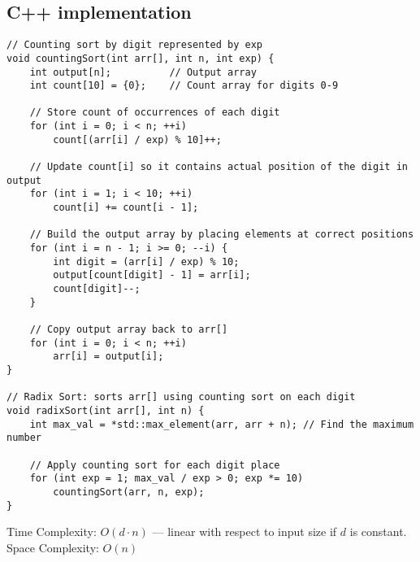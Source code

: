 \documentclass{article}
\begin{document}
\subsection{C++ implementation}

\begin{lstlisting}[style=cppstyle]
// Counting sort by digit represented by exp
void countingSort(int arr[], int n, int exp) {
    int output[n];          // Output array
    int count[10] = {0};    // Count array for digits 0-9

    // Store count of occurrences of each digit
    for (int i = 0; i < n; ++i)
        count[(arr[i] / exp) % 10]++;

    // Update count[i] so it contains actual position of the digit in output
    for (int i = 1; i < 10; ++i)
        count[i] += count[i - 1];

    // Build the output array by placing elements at correct positions
    for (int i = n - 1; i >= 0; --i) {
        int digit = (arr[i] / exp) % 10;
        output[count[digit] - 1] = arr[i];
        count[digit]--;
    }

    // Copy output array back to arr[]
    for (int i = 0; i < n; ++i)
        arr[i] = output[i];
}

// Radix Sort: sorts arr[] using counting sort on each digit
void radixSort(int arr[], int n) {
    int max_val = *std::max_element(arr, arr + n); // Find the maximum number

    // Apply counting sort for each digit place
    for (int exp = 1; max_val / exp > 0; exp *= 10)
        countingSort(arr, n, exp);
}
\end{lstlisting}



 Time Complexity: $O(d \cdot n)$ — linear with respect to input size if $d$ is constant. \\
 Space Complexity: $O(n)$ 
\end{document}
